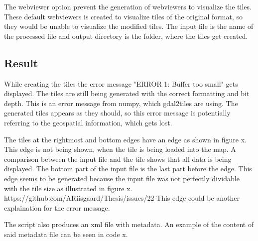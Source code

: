 The webviewer option prevent the generation of webviewers to visualize the tiles. These default webviewers is created to visualize tiles of the original format, so they would be unable to visualize the modified tiles. 
The input file is the name of the processed file and output directory is the folder, where the tiles get created. 
\subsection{Result}

While creating the tiles the error message "ERROR 1: Buffer too small" gets displayed. The tiles are still being generated with the correct formatting and bit depth. This is an error message from numpy, which gdal2tiles are using. 
\citep{MoreThan8}
The generated tiles appears as they should, so this error message is potentially referring to the geospatial information, which gets lost.

The tiles at the rightmost and bottom edges have an edge as shown in figure x. This edge is not being shown, when the tile is being loaded into the map. A comparison between the input file and the tile shows that all data is being displayed. The bottom part of the input file is the last part before the edge. This edge seems to be generated because the input file was not perfectly dividable with the tile size as illustrated in figure x.
https://github.com/ARiisgaard/Thesis/issues/22
This edge could be another explaination for the error message. 






The script also produces an xml file with metadata. An example of the content of said metadata file can be seen in code x.


